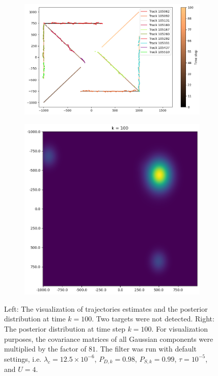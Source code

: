 \begin{figure}
    \centering
    \begin{subfigure}[]{0.48\linewidth}
        \centering
        \includegraphics[width=\linewidth]{figures/c3-traj.png}
    \end{subfigure}
    \hfill
    \begin{subfigure}[]{0.48\linewidth}
        \centering
        \includegraphics[width=\linewidth]{figures/c3-post.png}
    \end{subfigure}
  \caption[(C3). Trajectories estimations and the posterior intensity.]{Left: The visualization of trajectories estimates and the posterior distribution at time $k=100$. Two targets were not detected. Right: The posterior distribution at time step $k=100$. For visualization purposes, the covariance matrices of all Gaussian components were multiplied by the factor of $81$. The filter was run with default settings, i.e. $\lambda_{c} = 12.5 \times 10^{-6}$, $P_{D,k} = 0.98$, $P_{S,k} = 0.99$, $\tau = 10^{-5}$, and $U=4$.}
  \label{fig:c3-traj-post}
\end{figure}
